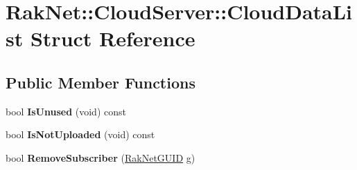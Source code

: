 \hypertarget{struct_rak_net_1_1_cloud_server_1_1_cloud_data_list}{\section{Rak\-Net\-:\-:Cloud\-Server\-:\-:Cloud\-Data\-List Struct Reference}
\label{struct_rak_net_1_1_cloud_server_1_1_cloud_data_list}
}
\subsection*{Public Member Functions}
\begin{DoxyCompactItemize}
\item 
\hypertarget{struct_rak_net_1_1_cloud_server_1_1_cloud_data_list_ae584da88f40ed988be3b49e4e2e76e82}{bool {\bfseries Is\-Unused} (void) const }\label{struct_rak_net_1_1_cloud_server_1_1_cloud_data_list_ae584da88f40ed988be3b49e4e2e76e82}

\item 
\hypertarget{struct_rak_net_1_1_cloud_server_1_1_cloud_data_list_a8097b015579fca78fd7fbc13fbab465e}{bool {\bfseries Is\-Not\-Uploaded} (void) const }\label{struct_rak_net_1_1_cloud_server_1_1_cloud_data_list_a8097b015579fca78fd7fbc13fbab465e}

\item 
\hypertarget{struct_rak_net_1_1_cloud_server_1_1_cloud_data_list_a35e5a3d2a2bdd26d636c5ffacf124c46}{bool {\bfseries Remove\-Subscriber} (\hyperlink{struct_rak_net_1_1_rak_net_g_u_i_d}{Rak\-Net\-G\-U\-I\-D} g)}\label{struct_rak_net_1_1_cloud_server_1_1_cloud_data_list_a35e5a3d2a2bdd26d636c5ffacf124c46}

\end{DoxyCompactItemize}
